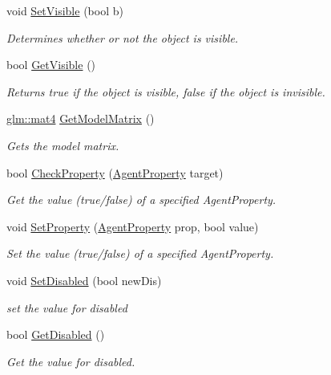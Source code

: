 \begin{DoxyCompactItemize}
void \hyperlink{struct_agent_a82766fa6b32f2f347c79eb669dd080d6}{Set\+Visible} (bool b)
\begin{DoxyCompactList}\small\item\em Determines whether or not the object is visible. \end{DoxyCompactList}\item 
bool \hyperlink{struct_agent_a5be15897c8663390f65c18d59c8dd883}{Get\+Visible} ()
\begin{DoxyCompactList}\small\item\em Returns true if the object is visible, false if the object is invisible. \end{DoxyCompactList}\item 
\hyperlink{_types_8h_a2db59f395fe82a7394c6324956c265d8}{glm\+::mat4} \hyperlink{struct_agent_a3b0f5c28eddeda3fcf002633ab43fae0}{Get\+Model\+Matrix} ()
\begin{DoxyCompactList}\small\item\em Gets the model matrix. \end{DoxyCompactList}\item 
bool \hyperlink{struct_agent_a51d3f034af5810302abb3eda96d66d39}{Check\+Property} (\hyperlink{_agent_8h_ab486bd3cbb07abc600b5b7586f95f7f5}{Agent\+Property} target)
\begin{DoxyCompactList}\small\item\em Get the value (true/false) of a specified Agent\+Property. \end{DoxyCompactList}\item 
void \hyperlink{struct_agent_ae9dba04d6c1ca72bb6451f1f2f81be95}{Set\+Property} (\hyperlink{_agent_8h_ab486bd3cbb07abc600b5b7586f95f7f5}{Agent\+Property} prop, bool value)
\begin{DoxyCompactList}\small\item\em Set the value (true/false) of a specified Agent\+Property. \end{DoxyCompactList}\item 
void \hyperlink{struct_agent_a01fb711b44cb03494a9751f66a7b4d7e}{Set\+Disabled} (bool new\+Dis)
\begin{DoxyCompactList}\small\item\em set the value for disabled \end{DoxyCompactList}\item 
bool \hyperlink{struct_agent_a29b7642fb4e6e623700ab479561fcdfb}{Get\+Disabled} ()
\begin{DoxyCompactList}\small\item\em Get the value for disabled. \end{DoxyCompactList}\end{DoxyCompactItemize}
